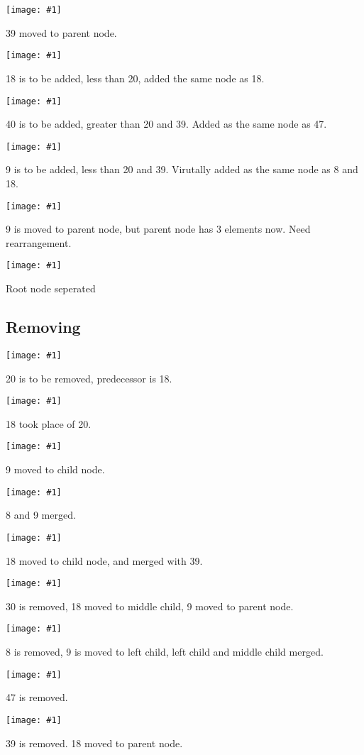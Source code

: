\documentclass[a4paper]{article}
\newcommand{\image}[2] {
  \noindent\begin{minipage}[c]{.6\textwidth}%
    \centering
    \strut\vspace*{-\baselineskip}\newline\texttt{[image: \#1]}
  \end{minipage}%
  \hfill%
  \begin{minipage}[c]{.4\textwidth}
    #2
  \end{minipage}
}
\begin{document}
  \image{2-3/add/6.png}{39 moved to parent node.}
  \vspace{2em}

  \image{2-3/add/7.png}{18 is to be added, less than 20, added the same node as 18.}
  \vspace{2em}

  \image{2-3/add/8.png}{40 is to be added, greater than 20 and 39. Added as the same node as 47.}
  \vspace{2em}

  \image{2-3/add/9.png}{9 is to be added, less than 20 and 39. Virutally added as the same node as 8 and 18.}
  \vspace{2em}

  \image{2-3/add/10.png}{9 is moved to parent node, but parent node has 3 elements now. Need rearrangement.}
  \vspace{2em}

  \image{2-3/add/11.png}{Root node seperated}

  \subsection{Removing}

  \image{2-3/del/0.png}{20 is to be removed, predecessor is 18.}
  \vspace{2em}

  \image{2-3/del/1.png}{18 took place of 20.}
  \vspace{2em}

  \image{2-3/del/2.png}{9 moved to child node.}
  \vspace{2em}

  \image{2-3/del/3.png}{8 and 9 merged.}
  \vspace{2em}

  \image{2-3/del/4.png}{18 moved to child node, and merged with 39.}
  \vspace{2em}

  \image{2-3/del/5.png}{30 is removed, 18 moved to middle child, 9 moved to parent node.}
  \vspace{2em}

  \image{2-3/del/6.png}{8 is removed, 9 is moved to left child, left child and middle child merged.}
  \vspace{2em}

  \image{2-3/del/7.png}{47 is removed.}
  \vspace{2em}

  \image{2-3/del/8.png}{39 is removed. 18 moved to parent node.}
  \vspace{2em}
\end{document}
